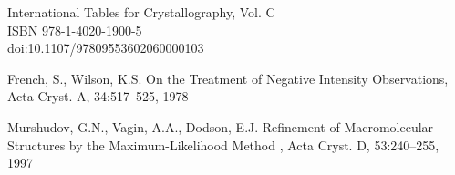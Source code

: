\documentclass[11pt]{article}
\newcommand{\authors}[1]{#1\hspace{3mm}}
\newcommand{\name}[2]{#2, #1}
\newcommand{\And}{, }
\newcommand{\btitle}[1]{{#1,}}
\newcommand{\journal}[4]{#1, #2:#3, #4}
\begin{document}
\begin{thebibliography}{99}

International Tables for Crystallography, Vol. C\\
ISBN 978-1-4020-1900-5 \\
doi:10.1107/97809553602060000103

\authors{\name{S.}{French}\And\name{K.S.}{Wilson}}
\btitle{On the Treatment of Negative Intensity Observations}
\journal{Acta Cryst. A}{34}{517--525}{1978}

\authors{\name{G.N.}{Murshudov}, \name{A.A.}{Vagin}\And\name{E.J.}{Dodson}}
\btitle{Refinement of Macromolecular Structures by the
        Maximum-Likelihood Method }
\journal{Acta Cryst. D}{53}{240--255}{1997}

\end{thebibliography}
\end{document}
